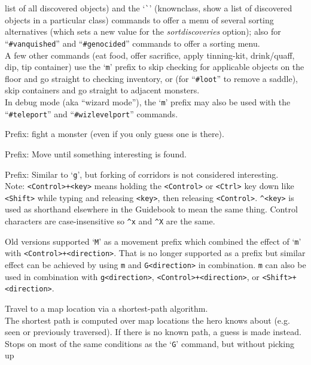 list of all discovered objects) and the `{\tt \`{}}' (knownclass,
show a list of discovered objects in a particular class) commands to offer
a menu of several sorting alternatives (which sets a new value for the
{\it sortdiscoveries\/}
option); also for ``{\tt \#vanquished}'' and ``{\tt \#genocided}'' commands
to offer a sorting menu.
\\
A few other commands (eat food, offer sacrifice, apply tinning-kit,
drink/quaff, dip, tip container) use
the `{\tt m}' prefix to skip checking for applicable objects on
the floor and go straight to checking inventory,
or (for ``{\tt \#loot}'' to remove a saddle),
skip containers and go straight to adjacent monsters.
\\
In debug mode (aka ``wizard mode''), the `{\tt m}' prefix may also be
used with the ``{\tt \#teleport}'' and ``{\tt \#wizlevelport}'' commands.
\item[\tb{F[yuhjklbn]}]
Prefix:  fight a monster (even if you only guess one is there).
\item[\tb{g[yuhjklbn]}]
Prefix:  Move until something interesting is found.
\item[\tb{G[yuhjklbn] {\rm or} <Control>+[yuhjklbn]}]
Prefix:  Similar to `{\tt g}', but forking of corridors is not considered
interesting.
\\
Note:  {\tt <Control>+<key>} means holding the {\tt <Control>} or
{\tt <Ctrl>} key down like {\tt <Shift>} while typing and releasing
{\tt <key>}, then releasing {\tt <Control>}.  {\tt \^{}<key>} is used as
shorthand elsewhere in the Guidebook to mean the same thing.  Control
characters are case-insensitive so {\tt \^{}x} and {\tt \^{}X} are the same.
\item[\tb{M[yuhjklbn]}]
Old versions supported `{\tt M}' as a movement prefix which
combined the effect of `{\tt m}' with {\tt <Control>+<direction>}.
That is no longer supported as a prefix but similar effect can be achieved
by using {\tt m} and {\tt G<direction>} in combination.
{\tt m} can also be used in combination with {\tt g<direction>},
{\tt <Control>+<direction>}, or {\tt <Shift>+<direction>}.
\item[\tb{\tt \verb+_+}]
Travel to a map location via a shortest-path algorithm.\\
The shortest path
is computed over map locations the hero knows about (e.g. seen or
previously traversed).
If there is no known path, a guess is made instead.
Stops on most of
the same conditions as the `{\tt G}' command, but without picking up
